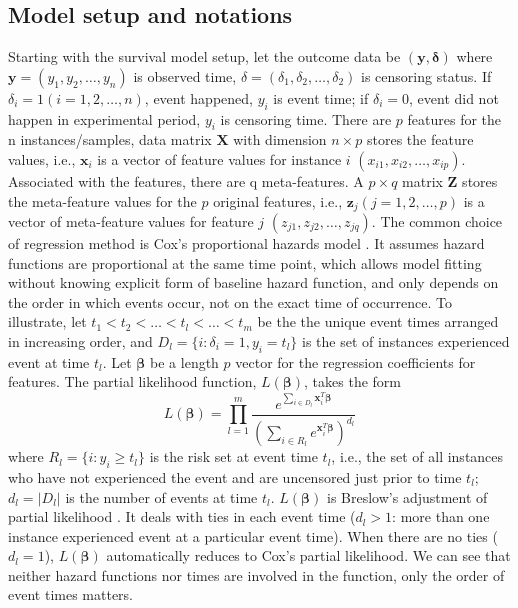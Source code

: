 \documentclass[12pt]{article}
\begin{document}
\subsection{Model setup and notations}
Starting with the survival model setup, let the outcome data be $(\bm{y, \delta})$ where $\bm{y}=(y_1,y_2,\dots,y_n)$ is observed time, $\delta=(\delta_1,\delta_2,\dots,\delta_2)$ is censoring status. If $\delta_i = 1 (i=1,2,\dots,n)$, event happened, $y_i$ is event time; if $\delta_i=0$, event did not happen in experimental period, $y_i$ is censoring time. There are $p$ features for the n instances/samples, data matrix $\bm{X}$ with dimension $n\times p$ stores the feature values, i.e., $\bm{x}_i$ is a vector of feature values for instance $i$ $(x_{i1},x_{i2},\dots,x_{ip})$. Associated with the features, there are q meta-features. A $p\times q$ matrix $\bm{Z}$ stores the meta-feature values for the $p$ original features, i.e., $\bm{z}_j (j=1,2,\dots,p)$ is a vector of meta-feature values for feature $j$ $(z_{j1},z_{j2},\dots,z_{jq})$. The common choice of regression method is Cox's proportional hazards model \citep{cox1972regression}. It assumes hazard functions are proportional at the same time point, which allows model fitting without knowing explicit form of baseline hazard function, and only depends on the order in which events occur, not on the exact time of occurrence. To illustrate, let $t_1<t_2<\dots<t_l<\dots<t_m$ be the the unique event times arranged in increasing order, and $D_l=\{i:\delta_i=1,y_i=t_l\}$ is the set of instances experienced event at time $t_l$. Let $\bm{\beta}$ be a length $p$ vector for the regression coefficients for features. The partial likelihood function, $L(\bm{\beta})$, takes the form 
\begin{displaymath}
L(\bm{\beta}) = \prod_{l=1}^{m} \frac{e^{\sum_{i\in D_l}\bm{x}_i^T\bm{\beta}}}{(\sum_{i\in R_l} e^{\bm{x}_i^T\bm{\beta}})^{d_l}}
\end{displaymath}
where $R_l=\{i: y_i\geq t_l\}$ is the risk set at event time $t_l$, i.e., the set of all instances who have not experienced the event and are uncensored just prior to time $t_l$; $d_l=|D_l|$ is the number of events at time $t_l$. $L(\bm{\beta})$ is Breslow's adjustment of partial likelihood \citep{breslow1972contribution}. It deals with ties in each event time ($d_l>1$: more than one instance experienced event at a particular event time). When there are no ties ($d_l=1$), $L(\bm{\beta})$ automatically reduces to Cox's partial likelihood. We can see that neither hazard functions nor times are involved in the function, only the order of event times matters. 
\end{document}
